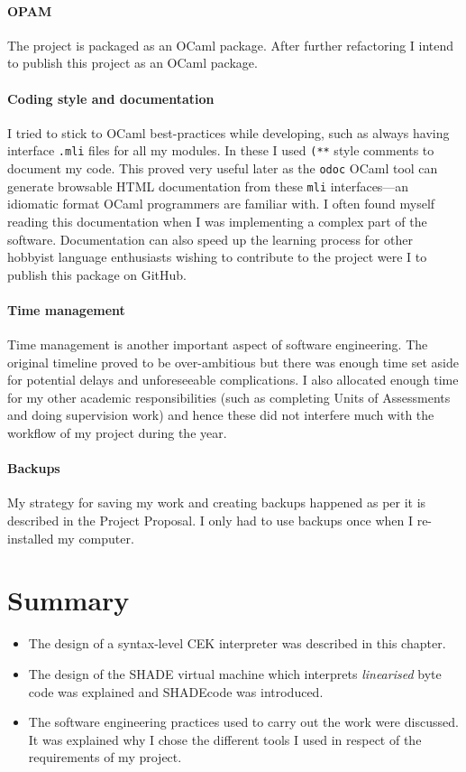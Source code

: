 \documentclass[class=article, crop=false]{standalone}
\begin{document}
\paragraph{OPAM}

The project is packaged as an OCaml package. After further refactoring I
intend to publish this project as an OCaml package.

\paragraph{Coding style and documentation}

I tried to stick to OCaml best-practices while developing, such as always
having interface \verb|.mli| files for all my modules.
In these I used \verb|(**| style comments to document my code. This proved very
useful later as the \verb|odoc| OCaml tool can generate browsable HTML
documentation from these \verb|mli| interfaces---an idiomatic format OCaml
programmers are familiar with.
I often found myself reading this documentation when I was implementing a complex
part of the software. Documentation can also speed up the learning
process for other hobbyist language enthusiasts wishing to contribute to the
project were I to publish this package on GitHub.

\paragraph{Time management}

Time management is another important aspect of software engineering. The original
timeline proved to be over-ambitious but there was enough time set aside for
potential delays and unforeseeable complications. I also allocated enough time
for my other academic responsibilities (such as completing Units of Assessments
and doing supervision work) and hence these did not interfere much with the
workflow of my project during the year.

\paragraph{Backups}

My strategy for saving my work and creating backups happened as per it is
described in the Project Proposal. I only had to use backups once when I
re-installed my computer.

\section{Summary}
\begin{itemize}
\item The design of a syntax-level CEK interpreter was described in this chapter.
\item The design of the SHADE virtual machine which interprets \emph{linearised}
byte code was explained and SHADEcode was introduced.
\item The software engineering practices used to carry out the work were discussed.
It was explained why I chose the different tools I used in respect of the
requirements of my project.
\end{itemize}
\end{document}
